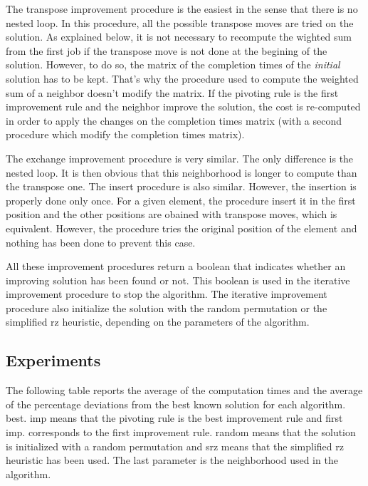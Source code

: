 \documentclass{article}
\begin{document}
The transpose improvement procedure is the easiest in the sense that there is no nested loop.
In this procedure, all the possible transpose moves are tried on the solution.
As explained below, it is not necessary to recompute the wighted sum from the first job if the transpose move is not done at the begining of the solution.
However, to do so, the matrix of the completion times of the \textit{initial} solution has to be kept.
That's why the procedure used to compute the weighted sum of a neighbor doesn't modify the matrix.
If the pivoting rule is the first improvement rule and the neighbor improve the solution, the cost is re-computed in order to apply the changes on the completion times matrix (with a second procedure which modify the completion times matrix). \newline

The exchange improvement procedure is very similar.
The only difference is the nested loop.
It is then obvious that this neighborhood is longer to compute than the transpose one.
The insert procedure is also similar.
However, the insertion is properly done only once.
For a given element, the procedure insert it in the first position and the other positions are obained with transpose moves, which is equivalent.
However, the procedure tries the original position of the element and nothing has been done to prevent this case. \newline

All these improvement procedures return a boolean that indicates whether an improving solution has been found or not.
This boolean is used in the iterative improvement procedure to stop the algorithm.
The iterative improvement procedure also initialize the solution with the random permutation or the simplified rz heuristic, depending on the parameters of the algorithm.

\subsection{Experiments}

The following table reports the average of the computation times and the average of the percentage deviations from the best known solution for each algorithm.
best. imp means that the pivoting rule is the best improvement rule and first imp. corresponds to the first improvement rule.
random means that the solution is initialized with a random permutation and srz means that the simplified rz heuristic has been used.
The last parameter is the neighborhood used in the algorithm.
\end{document}
